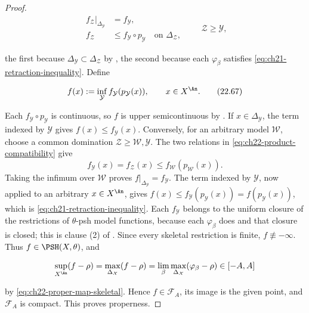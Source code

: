 \begin{proof}
\[
 \begin{aligned}
 f_{\mathcal Z}|_{\Delta_{\mathcal Y}}&=f_{\mathcal Y},\\
 f_{\mathcal Z}&\leq f_{\mathcal Y}\circ p_{\mathcal Y}
                    \quad\text{on }\Delta_{\mathcal Z},
 \end{aligned}
 \qquad \mathcal Z\geq\mathcal Y,
\tag{22.66}\label{eq:ch22-product-compatibility}
\]

the first because $\Delta_{\mathcal Y}\subset\Delta_{\mathcal Z}$ by
, the second because each $\varphi_\beta$
satisfies \eqref{eq:ch21-retraction-inequality}.  Define

\[
           f(x):=\inf_{\mathcal Y}
                  f_{\mathcal Y}(p_{\mathcal Y}(x)),
           \qquad x\in X^{\An}.
\tag{22.67}\label{eq:ch22-product-limit-function}
\]

Each $f_{\mathcal Y}\circ p_{\mathcal Y}$ is continuous, so $f$ is upper
semicontinuous by .  If
$x\in\Delta_{\mathcal Y}$, the term indexed by $\mathcal Y$ gives
$f(x)\leq f_{\mathcal Y}(x)$.  Conversely, for an arbitrary model
$\mathcal W$, choose a common domination
$\mathcal Z\geq\mathcal W,\mathcal Y$.  The two relations in
\eqref{eq:ch22-product-compatibility} give
\[
 f_{\mathcal Y}(x)=f_{\mathcal Z}(x)
 \leq f_{\mathcal W}(p_{\mathcal W}(x)).
\]
Taking the infimum over $\mathcal W$ proves
$f|_{\Delta_{\mathcal Y}}=f_{\mathcal Y}$.  The term indexed by
$\mathcal Y$, now applied to an arbitrary $x\in X^{\An}$, gives
$f(x)\leq f_{\mathcal Y}(p_{\mathcal Y}(x))=f(p_{\mathcal Y}(x))$, which is
\eqref{eq:ch21-retraction-inequality}.  Each $f_{\mathcal Y}$ belongs to
the uniform closure of the restrictions of $\theta$-psh model functions,
because each $\varphi_\beta$ does and that closure is closed; this is
clause (2) of .  Since every skeletal restriction is
finite, $f\not\equiv-\infty$.  Thus $f\in\PSH(X,\theta)$, and

\[
 \sup_{X^{\An}}(f-\rho)=\max_{\Delta_{\mathcal X}}(f-\rho)
 =\lim_\beta\max_{\Delta_{\mathcal X}}(\varphi_\beta-\rho)\in[-A,A]
\]

by \eqref{eq:ch22-proper-map-skeletal}.  Hence $f\in\mathcal F_A$, its
image is the given point, and $\mathcal F_A$ is compact.  This proves
properness.


\end{proof}
